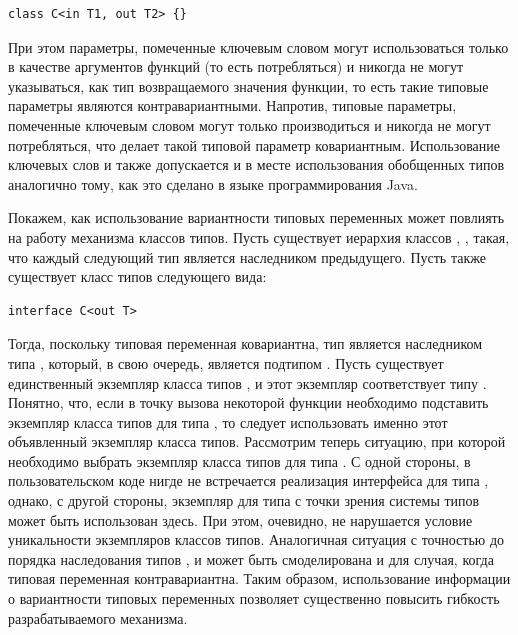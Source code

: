 \begin{lstlisting}[style=wo_caption]
class C<in T1, out T2> {}
\end{lstlisting}
При этом параметры, помеченные ключевым словом  могут использоваться только в качестве аргументов функций (то есть потребляться) и никогда не могут указываться, как тип возвращаемого значения функции, то есть такие типовые параметры являются контравариантными. Напротив, типовые параметры, помеченные ключевым словом  могут только производиться и никогда не могут потребляться, что делает такой типовой параметр ковариантным. Использование ключевых слов  и  также допускается и в месте использования обобщенных типов аналогично тому, как это сделано в языке программирования Java. 

Покажем, как использование вариантности типовых переменных может повлиять на работу механизма классов типов. Пусть существует иерархия классов , ,  такая, что каждый следующий тип является наследником предыдущего. Пусть также существует класс типов  следующего вида:
\begin{lstlisting}[style=wo_caption]
interface C<out T>
\end{lstlisting}
Тогда, поскольку типовая переменная  ковариантна, тип  является наследником типа , который, в свою очередь, является подтипом . Пусть существует единственный экземпляр класса типов , и этот экземпляр соответствует типу . Понятно, что, если в точку вызова некоторой функции необходимо подставить экземпляр класса типов  для типа , то следует использовать именно этот объявленный экземпляр класса типов. Рассмотрим теперь ситуацию, при которой необходимо выбрать экземпляр класса типов  для типа . С одной стороны, в пользовательском коде нигде не встречается реализация интерфейса  для типа , однако, с другой стороны, экземпляр для типа  с точки зрения системы типов может быть использован здесь. При этом, очевидно, не нарушается условие уникальности экземпляров классов типов. Аналогичная ситуация с точностью до порядка наследования типов ,  и  может быть смоделирована и для случая, когда типовая переменная  контравариантна. Таким образом, использование информации о вариантности типовых переменных позволяет существенно повысить гибкость разрабатываемого механизма. 

